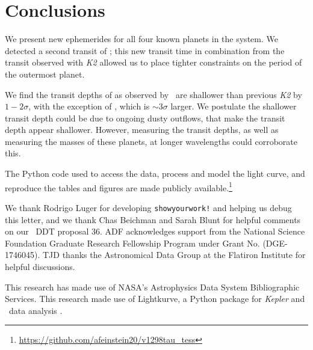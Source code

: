 \documentclass[twocolumn]{aastex631}
\begin{document}
\section{Conclusions} \label{sec:conclusions}

We present new ephemerides for all four known planets in the \sname system. We detected a second transit of \planete; this new transit time in combination from the transit observed with \textit{K2} allowed us to place tighter constraints on the period of the outermost planet.

We find the transit depths of \planetknown as observed by \tess\ are shallower than previous \textit{K2} by $1-2\sigma$, with the exception of \planete, which is $\sim 3\sigma$ larger. We postulate the shallower transit depth could be due to ongoing dusty outflows, that make the transit depth appear shallower. However, measuring the transit depths, as well as measuring the masses of these planets, at longer wavelengths could corroborate this.

The Python code used to access the data, process and model the light curve, and reproduce the tables and figures are made publicly available.\footnote{\url{https://github.com/afeinstein20/v1298tau_tess}}

\begin{acknowledgments}
We thank Rodrigo Luger for developing \texttt{showyourwork!} \citep{luger21} and helping us debug this letter, and we thank Chas Beichman and Sarah Blunt for helpful comments on our \tess\ DDT proposal 36. ADF acknowledges support from the National Science Foundation Graduate Research Fellowship Program under Grant No. (DGE-1746045). TJD thanks the Astronomical Data Group at the Flatiron Institute for helpful discussions. 

This research has made use of NASA's Astrophysics Data System Bibliographic Services. This research made use of Lightkurve, a Python package for \textit{Kepler} and \tess\ data analysis \citep{lightkurve}.

\end{acknowledgments}
\end{document}
